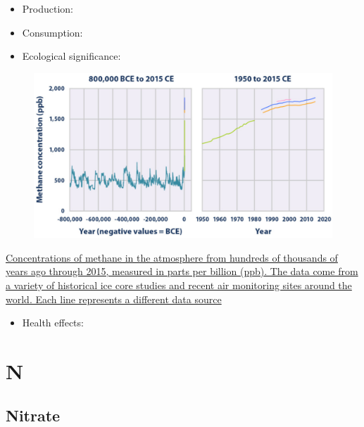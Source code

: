\documentclass[]{book}
\providecommand{\tightlist}{%
  \setlength{\itemsep}{0pt}\setlength{\parskip}{0pt}}
\theoremstyle{definition}
\theoremstyle{definition}
\theoremstyle{definition}
\theoremstyle{remark}
\begin{document}
\begin{itemize}
\item
  Production:
\item
  Consumption:
\item
  Ecological significance:
\end{itemize}

\begin{figure}
\centering
\includegraphics{pictures/CH4_concentrations.png}
\caption{}
\end{figure}

\href{https://www.epa.gov/sites/production/files/2016-08/documents/print_ghg-concentrations-2016.pdf}{Concentrations
of methane in the atmosphere from hundreds of thousands of years ago
through 2015, measured in parts per billion (ppb). The data come from a
variety of historical ice core studies and recent air monitoring sites
around the world. Each line represents a different data
source}\citep{Epa2016-yj}

\begin{itemize}
\tightlist
\item
  Health effects:
\end{itemize}

\section{N}\label{n}

\subsection{Nitrate}\label{nitrate}
\end{document}

